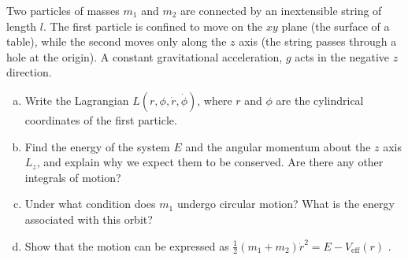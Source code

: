 \documentclass[12pt]{article}
\newenvironment{problem}[2][Problem]{\begin{trivlist}
\item[\hskip \labelsep {\bfseries #1}\hskip \labelsep {\bfseries #2.}]}{\end{trivlist}}
\begin{document}
\begin{problem}{4}
Two particles of masses $m_1$ and $m_2$ are connected by an inextensible string of length $l$. The first particle is confined to move on the $xy$ plane (the surface of a table), while the second moves only along the $z$ axis (the string passes through a hole at the origin). A constant gravitational acceleration, $g$ acts in the negative $z$ direction.
\begin{enumerate}[(a)]
\item Write the Lagrangian $L(r,\phi,\dot{r},\dot{\phi})$, where $r$ and $\phi$ are the cylindrical coordinates of the first particle.
\item Find the energy of the system $E$ and the angular momentum about the $z$ axis $L_{z}$, and explain why we expect them to be conserved. Are there any other integrals of motion?
\item Under what condition does $m_1$ undergo circular motion? What is the energy associated with this orbit?
\item Show that the motion can be expressed as $\frac{1}{2}(m_1+m_2)\dot{r}^2=E-V_{\text{eff}}(r)$ .
\end{enumerate}

\begin{center}
\end{center}
\end{problem}

 
\end{document}
